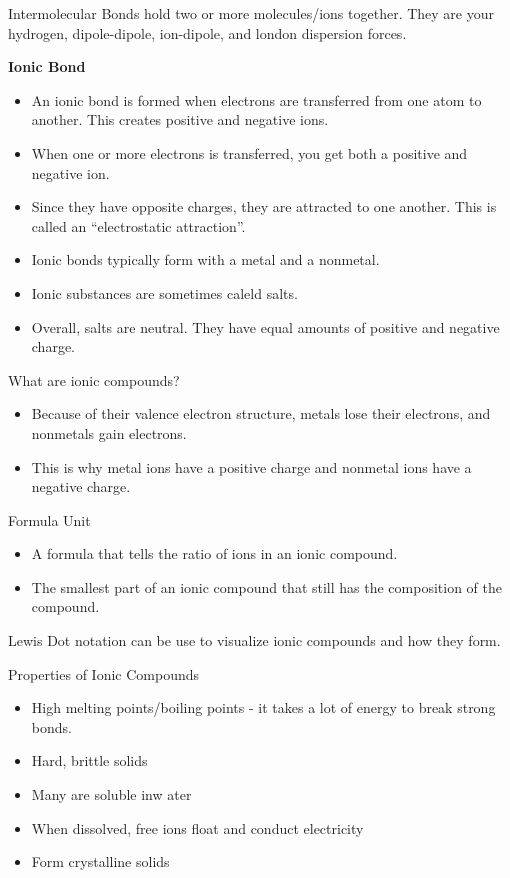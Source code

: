 \documentclass[../hchem.tex]{subfiles}
\begin{document}
Intermolecular Bonds hold two or more molecules/ions together. They are your hydrogen, dipole-dipole, ion-dipole, and london dispersion forces.

\textbf{Ionic Bond}
\begin{itemize}
    \item An ionic bond is formed when electrons are transferred from one atom to another. This creates positive and negative ions.
    \item When one or more electrons is transferred, you get both a positive and negative ion.
    \item Since they have opposite charges, they are attracted to one another. This is called an ``electrostatic attraction''.
    \item Ionic bonds typically form with a metal and a nonmetal.
    \item Ionic substances are sometimes caleld salts. 
    \item Overall, salts are neutral. They have equal amounts of positive and negative charge.
\end{itemize}

What are ionic compounds?
\begin{itemize}
    \item Because of their valence electron structure, metals lose their electrons, and nonmetals gain electrons.
    \item This is why metal ions have a positive charge and nonmetal ions have a negative charge.
\end{itemize}

Formula Unit 
\begin{itemize}
    \item A formula that tells the ratio of ions in an ionic compound.
    \item The smallest part of an ionic compound that still has the composition of the compound.
\end{itemize}

Lewis Dot notation can be use to visualize ionic compounds and how they form.

Properties of Ionic Compounds
\begin{itemize}
    \item High melting points/boiling points - it takes a lot of energy to break strong bonds.
    \item Hard, brittle solids 
    \item Many are soluble inw ater 
    \item When dissolved, free ions float and conduct electricity 
    \item Form crystalline solids 
\end{itemize}
\end{document}
